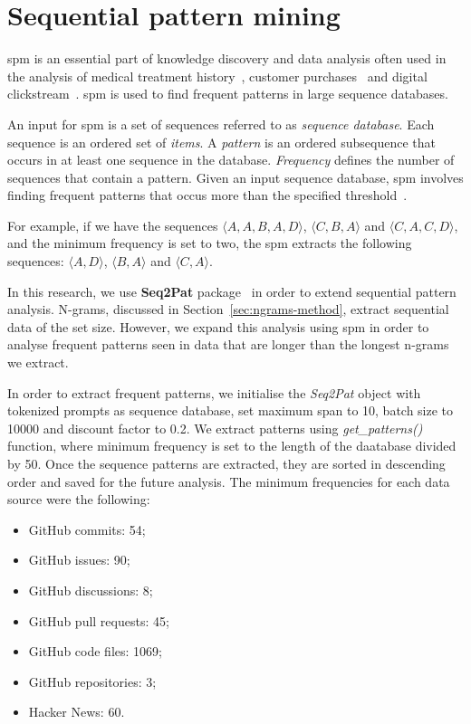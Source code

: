 \section{Sequential pattern mining}
\acrfull{spm} is an essential part of knowledge discovery and data analysis often used in the analysis of medical treatment history~\cite{bou2018medical}, customer purchases~\cite{agrawal1995mining} and digital clickstream~\cite{requena2020shopper}. \Acrshort{spm} is used to find frequent patterns in large sequence databases.

An input for \acrshort{spm} is a set of sequences referred to as \textit{sequence database}. Each sequence is an ordered set of \textit{items}. A \textit{pattern} is an ordered subsequence that occurs in at least one sequence in the database. \textit{Frequency} defines the number of sequences that contain a pattern. Given an input sequence database, \acrshort{spm} involves finding frequent patterns that occus more than the specified threshold~\cite{seq2pat}.

For example, if we have the sequences $\langle A, A, B, A, D \rangle$, $\langle C, B, A \rangle$ and $\langle C, A, C, D \rangle$, and the minimum frequency is set to two, the \acrshort{spm} extracts the following sequences: $\langle A, D \rangle$, $\langle B, A \rangle$ and $\langle C, A \rangle$.

In this research, we use \textbf{Seq2Pat} package~\cite{seq2pat2022} in order to extend sequential pattern analysis. N-grams, discussed in Section~\ref{sec:ngrams-method}, extract sequential data of the set size. However, we expand this analysis using \acrshort{spm} in order to analyse frequent patterns seen in data that are longer than the longest n-grams we extract. 

In order to extract frequent patterns, we initialise the \textit{Seq2Pat} object with tokenized prompts as sequence database, set maximum span to 10, batch size to 10000 and discount factor to 0.2. We extract patterns using \textit{get\_patterns()} function, where minimum frequency is set to the length of the daatabase divided by 50. Once the sequence patterns are extracted, they are sorted in descending order and saved for the future analysis. The minimum frequencies for each data source were the following:

\begin{itemize}
    \item GitHub commits: 54;
    \item GitHub issues: 90;
    \item GitHub discussions: 8;
    \item GitHub pull requests: 45;
    \item GitHub code files: 1069;
    \item GitHub repositories: 3;
    \item Hacker News: 60.
\end{itemize}

